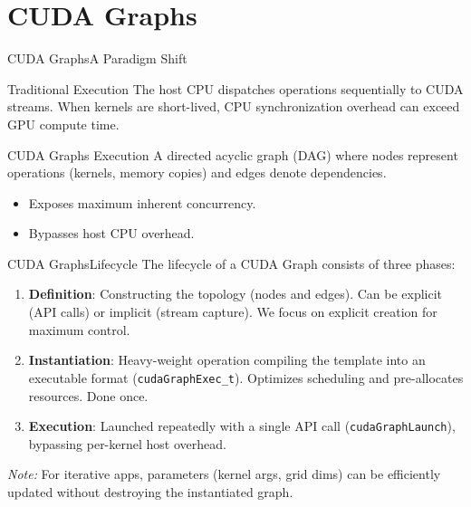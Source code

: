 \documentclass[10pt,aspectratio=43]{beamer}
\begin{document}
\section{CUDA Graphs}
\begin{frame}{CUDA Graphs}{A Paradigm Shift}
    \begin{block}{Traditional Execution}
        The host CPU dispatches operations sequentially to CUDA streams. When kernels are short-lived, CPU synchronization overhead can exceed GPU compute time.
    \end{block}
    
    \begin{block}{CUDA Graphs Execution}
        A directed acyclic graph (DAG) where nodes represent operations (kernels, memory copies) and edges denote dependencies.
        \begin{itemize}
            \item Exposes maximum inherent concurrency.
            \item Bypasses host CPU overhead.
        \end{itemize}
    \end{block}
\end{frame}

\begin{frame}{CUDA Graphs}{Lifecycle}
    The lifecycle of a CUDA Graph consists of three phases:
    \begin{enumerate}
        \item \textbf{Definition}: Constructing the topology (nodes and edges). Can be explicit (API calls) or implicit (stream capture). We focus on explicit creation for maximum control.
        \item \textbf{Instantiation}: Heavy-weight operation compiling the template into an executable format (\texttt{cudaGraphExec\_t}). Optimizes scheduling and pre-allocates resources. Done once.
        \item \textbf{Execution}: Launched repeatedly with a single API call (\texttt{cudaGraphLaunch}), bypassing per-kernel host overhead.
    \end{enumerate}
    \textit{Note:} For iterative apps, parameters (kernel args, grid dims) can be efficiently updated without destroying the instantiated graph.
\end{frame}

\end{document}
